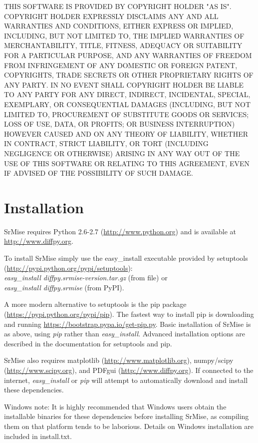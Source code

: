 \documentclass[12pt]{article}
\begin{document}
THIS SOFTWARE IS PROVIDED BY COPYRIGHT HOLDER "AS IS". COPYRIGHT
HOLDER EXPRESSLY DISCLAIMS ANY AND ALL WARRANTIES AND CONDITIONS,
EITHER EXPRESS OR IMPLIED, INCLUDING, BUT NOT LIMITED TO, THE
IMPLIED WARRANTIES OF MERCHANTABILITY, TITLE, FITNESS, ADEQUACY OR
SUITABILITY FOR A PARTICULAR PURPOSE, AND ANY WARRANTIES OF FREEDOM
FROM INFRINGEMENT OF ANY DOMESTIC OR FOREIGN PATENT, COPYRIGHTS,
TRADE SECRETS OR OTHER PROPRIETARY RIGHTS OF ANY PARTY. IN NO EVENT
SHALL COPYRIGHT HOLDER BE LIABLE TO ANY PARTY FOR ANY DIRECT,
INDIRECT, INCIDENTAL, SPECIAL, EXEMPLARY, OR CONSEQUENTIAL DAMAGES
(INCLUDING, BUT NOT LIMITED TO, PROCUREMENT OF SUBSTITUTE GOODS OR
SERVICES; LOSS OF USE, DATA, OR PROFITS; OR BUSINESS INTERRUPTION)
HOWEVER CAUSED AND ON ANY THEORY OF LIABILITY, WHETHER IN CONTRACT,
STRICT LIABILITY, OR TORT (INCLUDING NEGLIGENCE OR OTHERWISE)
ARISING IN ANY WAY OUT OF THE USE OF THIS SOFTWARE OR RELATING TO
THIS AGREEMENT, EVEN IF ADVISED OF THE POSSIBILITY OF SUCH DAMAGE.


\section{Installation}

{\sc SrMise} requires Python 2.6-2.7 (\url{http://www.python.org}) and
is available at \url{http://www.diffpy.org}.

To install {\sc SrMise} simply use the easy\_install executable provided by setuptools (\url{http://pypi.python.org/pypi/setuptools}):\\
\emph{easy\_install diffpy.srmise-version.tar.gz} (from file) or \\
\emph{easy\_install diffpy.srmise} (from PyPI).

A more modern alternative to setuptools is the pip package (\url{https://pypi.python.org/pypi/pip}).  The fastest way to install pip is downloading and running \url{https://bootstrap.pypa.io/get-pip.py}.  Basic installation of {\sc SrMise} is as above, using \emph{pip} rather than \emph{easy_install}.  Advanced installation options are described in the documentation for setuptools and pip.

{\sc SrMise} also requires matplotlib (\url{http://www.matplotlib.org}), numpy/scipy (\url{http://www.scipy.org}), and PDFgui (\url{http://www.diffpy.org}).  If connected to the internet, \emph{easy\_install} or \emph{pip} will attempt to automatically download and install these dependencies.

Windows note: It is highly recommended that Windows users obtain the installable binaries for these dependencies before installing {\sc SrMise}, as compiling them on that platform tends to be laborious.  Details on Windows installation are included in install.txt.
\end{document}

